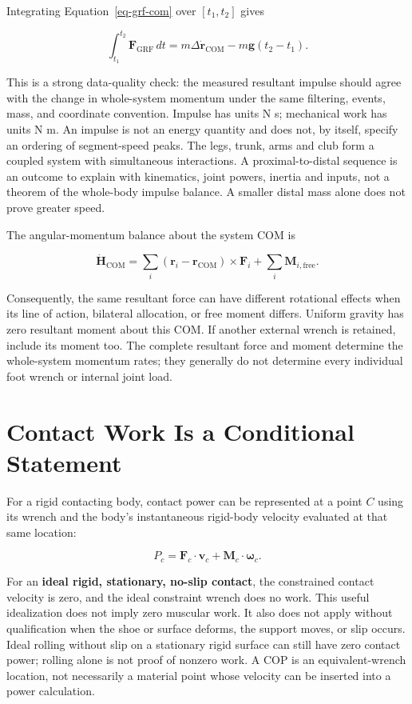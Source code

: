 Integrating Equation~\ref{eq-grf-com} over \([t_1,t_2]\) gives

\[
\int_{t_1}^{t_2}\bm{F}_{\mathrm{GRF}}\,dt
=m\Delta\dot{\bm{r}}_{\mathrm{COM}}-m\bm{g}(t_2-t_1).
\]

This is a strong data-quality check: the measured resultant impulse should agree with the change in whole-system momentum under the same filtering, events, mass, and coordinate convention. Impulse has units N s; mechanical work has units N m. An impulse is not an energy quantity and does not, by itself, specify an ordering of segment-speed peaks. The legs, trunk, arms and club form a coupled system with simultaneous interactions. A proximal-to-distal sequence is an outcome to explain with kinematics, joint powers, inertia and inputs, not a theorem of the whole-body impulse balance. A smaller distal mass alone does not prove greater speed.

The angular-momentum balance about the system COM is

\[
\dot{\bm{H}}_{\mathrm{COM}}
=\sum_i (\bm{r}_{i}-\bm{r}_{\mathrm{COM}})\times\bm{F}_i
+\sum_i\bm{M}_{i,\mathrm{free}}.
\]

Consequently, the same resultant force can have different rotational effects when its line of action, bilateral allocation, or free moment differs. Uniform gravity has zero resultant moment about this COM. If another external wrench is retained, include its moment too. The complete resultant force and moment determine the whole-system momentum rates; they generally do not determine every individual foot wrench or internal joint load.

\section{Contact Work Is a Conditional Statement}\label{sec:grf-work}\label{grf-contact-work-is-a-conditional-statement}

For a rigid contacting body, contact power can be represented at a point \(C\) using its wrench and the body's instantaneous rigid-body velocity evaluated at that same location:

\[
P_c=\bm{F}_c\cdot\bm{v}_c+\bm{M}_c\cdot\bm{\omega}_c.
\]

For an \textbf{ideal rigid, stationary, no-slip contact}, the constrained contact velocity is zero, and the ideal constraint wrench does no work. This useful idealization does not imply zero muscular work. It also does not apply without qualification when the shoe or surface deforms, the support moves, or slip occurs. Ideal rolling without slip on a stationary rigid surface can still have zero contact power; rolling alone is not proof of nonzero work. A COP is an equivalent-wrench location, not necessarily a material point whose velocity can be inserted into a power calculation.

